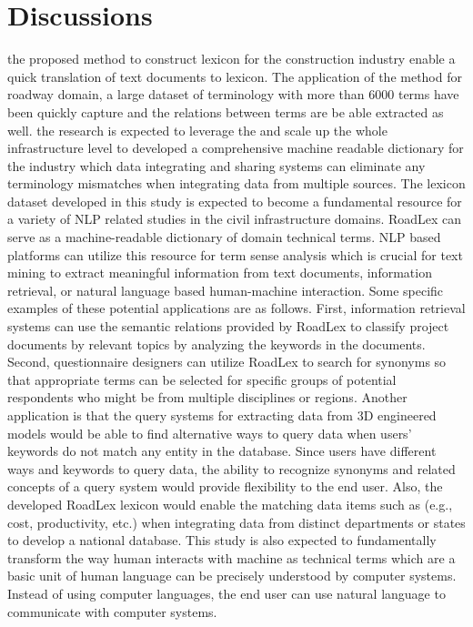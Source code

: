 \documentclass[Journal,InsideFigs, DoubleSpace]{ascelike} %
\begin{document}
%
\section{Discussions} \label{sec:dis}
the proposed method to construct lexicon for the construction industry enable a quick translation of text documents to lexicon. The application of the method for roadway domain, a large dataset of terminology with more than 6000 terms have been quickly capture and the relations between terms are be able extracted as well. the research is expected to leverage the and scale up the whole infrastructure level to developed a comprehensive machine readable dictionary for the industry which data integrating and sharing systems can eliminate any terminology mismatches when integrating data from multiple sources. 
The lexicon dataset developed in this study is expected to become a fundamental resource for a variety of NLP related studies in the civil infrastructure domains. RoadLex can serve as a machine-readable dictionary of domain technical terms. NLP based platforms can utilize this resource for term sense analysis which is crucial for text mining to extract meaningful information from text documents, information retrieval, or natural language based human-machine interaction. Some specific examples of these potential applications are as follows. First, information retrieval systems can use the semantic relations provided by RoadLex to classify project documents by relevant topics by analyzing the keywords in the documents. Second, questionnaire designers can utilize RoadLex to search for synonyms so that appropriate terms can be selected for specific groups of potential respondents who might be from multiple disciplines or regions. Another application is that the query systems for extracting data from 3D engineered models would be able to find alternative ways to query data when users' keywords do not match any entity in the database. Since users have different ways and keywords to query data, the ability to recognize synonyms and related concepts of a query system would provide flexibility to the end user. Also, the developed RoadLex lexicon would enable the matching data items such as (e.g., cost, productivity, etc.) when integrating data from distinct departments or states to develop a national database. This study is also expected to fundamentally transform the way human interacts with machine as technical terms which are a basic unit of human language can be precisely understood by computer systems. Instead of using computer languages, the end user can use natural language to communicate with computer systems.
\end{document}

